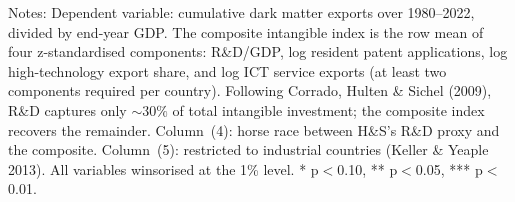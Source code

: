 \documentclass[11pt]{article}
\begin{document}
\small
\setcounter{table}{2}
\begin{table}[htbp]
\centering
\caption{Extension 2 --- Intangible Capital Intensity and Dark Matter (1980--2022)}
\label{tab:E2_intangibles}
\scriptsize
{}
\begin{minipage}{0.95\linewidth}
\footnotesize Notes: Dependent variable: cumulative dark matter exports over 1980--2022, divided by end-year GDP. The composite intangible index is the row mean of four z-standardised components: R\&D/GDP, log resident patent applications, log high-technology export share, and log ICT service exports (at least two components required per country). Following Corrado, Hulten \& Sichel (2009), R\&D captures only $\sim30\%$ of total intangible investment; the composite index recovers the remainder. Column~(4): horse race between H\&S's R\&D proxy and the composite. Column~(5): restricted to industrial countries (Keller \& Yeaple 2013). All variables winsorised at the 1\% level. * p$<$0.10, ** p$<$0.05, *** p$<$0.01.
\end{minipage}
\end{table}
\end{document}
